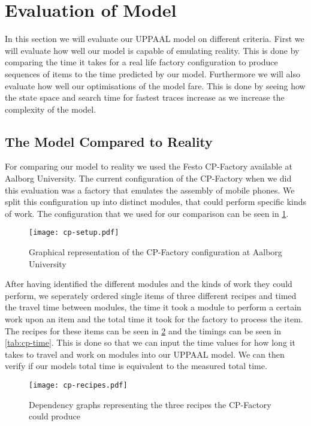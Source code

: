 \section{Evaluation of Model}
In this section we will evaluate our UPPAAL model on different criteria. First we will evaluate how well our model is capable of emulating reality. This is done by comparing the time it takes for a real life factory configuration to produce sequences of items to the time predicted by our model. Furthermore we will also evaluate how well our optimisations of the model fare. This is done by seeing how the state space and search time for fastest traces increase as we increase the complexity of the model.

\subsection{The Model Compared to Reality} 
For comparing our model to reality we used the Festo CP-Factory available at Aalborg University. The current configuration of the CP-Factory when we did this evaluation was a factory that emulates the assembly of mobile phones. We split this configuration up into distinct modules, that could perform specific kinds of work. The configuration that we used for our comparison can be seen in \cref{fig:cp-setup}.

\begin{figure}[h]
\centering
\texttt{[image: cp-setup.pdf]}
\caption{Graphical representation of the CP-Factory configuration at Aalborg University}
\label{fig:cp-setup}
\end{figure}

After having identified the different modules and the kinds of work they could perform, we seperately ordered single items of three different recipes and timed the travel time between modules, the time it took a module to perform a certain work upon an item and the total time it took for the factory to process the item. The recipes for these items can be seen in \cref{fig:cp-recipes} and the timings can be seen in \cref{tab:cp-time}. This is done so that we can input the time values for how long it takes to travel and work on modules into our UPPAAL model. We can then verify if our models total time is equivalent to the measured total time.

\begin{figure}[h]
\centering
\texttt{[image: cp-recipes.pdf]}
\caption{Dependency graphs representing the three recipes the CP-Factory could produce}
\label{fig:cp-recipes}
\end{figure}

